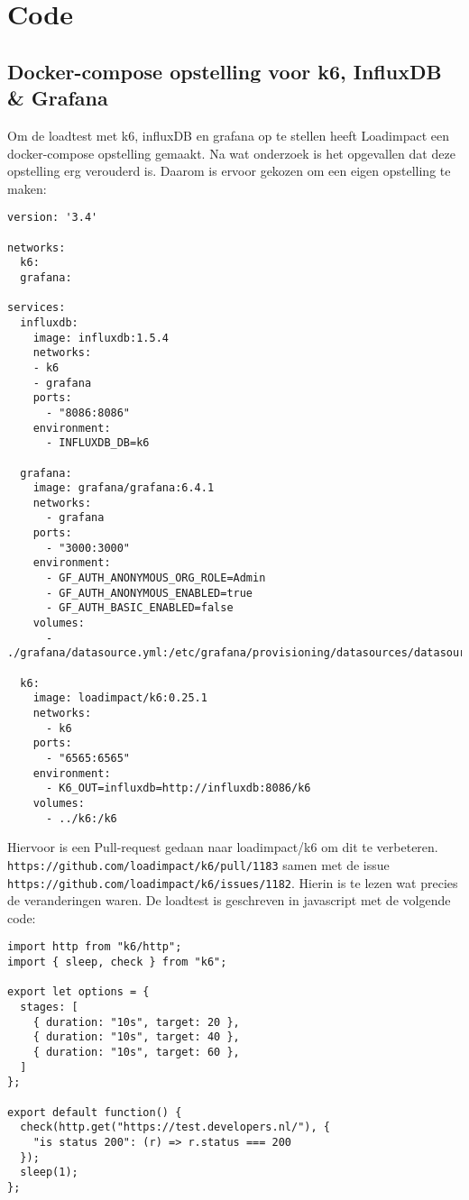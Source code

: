
\chapter{Code} %

\label{BijlageCode} 

\section{Docker-compose opstelling voor k6, InfluxDB \& Grafana}

\label{Bijlagek6}

Om de loadtest met k6, influxDB en grafana op te stellen heeft Loadimpact een docker-compose opstelling gemaakt. Na wat onderzoek is het opgevallen dat deze opstelling erg verouderd is. Daarom is ervoor gekozen om een eigen opstelling te maken:
\begin{verbatim}
version: '3.4'

networks:
  k6:
  grafana:

services:
  influxdb:
    image: influxdb:1.5.4
    networks:
    - k6
    - grafana
    ports:
      - "8086:8086"
    environment:
      - INFLUXDB_DB=k6
    
  grafana:
    image: grafana/grafana:6.4.1
    networks:
      - grafana
    ports:
      - "3000:3000"
    environment:
      - GF_AUTH_ANONYMOUS_ORG_ROLE=Admin
      - GF_AUTH_ANONYMOUS_ENABLED=true
      - GF_AUTH_BASIC_ENABLED=false
    volumes:
      - ./grafana/datasource.yml:/etc/grafana/provisioning/datasources/datasource.yml
  
  k6:
    image: loadimpact/k6:0.25.1
    networks:
      - k6
    ports:
      - "6565:6565"
    environment:
      - K6_OUT=influxdb=http://influxdb:8086/k6
    volumes:
      - ../k6:/k6
\end{verbatim}

Hiervoor is een Pull-request gedaan naar loadimpact/k6 om dit te verbeteren. \texttt{https://github.com/loadimpact/k6/pull/1183} samen met de issue\\ \texttt{https://github.com/loadimpact/k6/issues/1182}. Hierin is te lezen wat precies de veranderingen waren. De loadtest is geschreven in javascript met de volgende code:
\begin{verbatim}
import http from "k6/http";
import { sleep, check } from "k6";

export let options = {
  stages: [
    { duration: "10s", target: 20 },
    { duration: "10s", target: 40 },
    { duration: "10s", target: 60 },
  ]
};

export default function() {
  check(http.get("https://test.developers.nl/"), {
    "is status 200": (r) => r.status === 200
  });
  sleep(1);
};
\end{verbatim}

